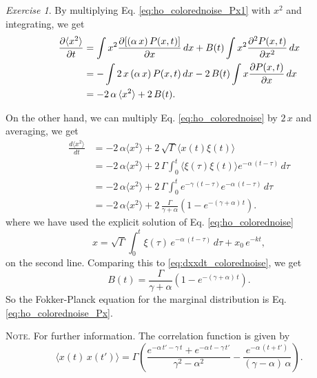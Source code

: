 \documentclass{book}
\numberwithin{equation}{section}
\theoremstyle{plain}
\theoremstyle{definition}
\theoremstyle{remark}
\theoremstyle{BoldStyle}
\newtheorem{exercise}{Exercise}
\numberwithin{exercise}{section}
\newcommand{\note}[1]{{\color{DarkGreen}\footnotesize \textsc{Note.} #1}}
\begin{document}
\begin{exercise}
{    By multiplying Eq. \eqref{eq:ho_colorednoise_Px1} with $x^2$ and integrating,
    we get
    \begin{align}
    \frac{ \partial \langle x^2 \rangle } { \partial t }
    &=
    \int x^2 \frac{ \partial [(\alpha \, x) \, P(x, t) ] } { \partial x} \, dx
    + B(t) \int x^2 \frac{ \partial^2 P(x, t) } { \partial x^2 } \, dx
    \notag
    \\
    &=
    -\int 2 \, x \, (\alpha \, x) \, P(x, t) \, dx
    - 2 \, B(t) \int x \frac{ \partial P(x, t) } { \partial x } \, dx
    \notag
    \\
    &=
    - 2 \, \alpha \, \langle x^2 \rangle
    + 2 \, B(t).
    \label{eq:dxxdt_colorednoise}
    \end{align}

    On the other hand,
    we can multiply Eq. \eqref{eq:ho_colorednoise} by $2 \, x$
    and averaging, we get
    $$
    \begin{aligned}
    \frac{ d\langle x^2 \rangle }{ dt }
    &=
    - 2 \, \alpha \langle x^2 \rangle
    + 2 \, \sqrt\Gamma \langle x(t) \xi(t) \rangle
    \\
    &=
    - 2 \, \alpha \langle x^2 \rangle
    + 2 \, \Gamma \int_0^t \langle \xi(\tau) \xi(t) \rangle e^{-\alpha \, (t - \tau)} \, d\tau
    \\
    &=
    - 2 \, \alpha \langle x^2 \rangle
    + 2 \, \Gamma \int_0^t e^{-\gamma \, (t - \tau)} e^{-\alpha \, (t - \tau)} \, d\tau
    \\
    &=
    - 2 \, \alpha \langle x^2 \rangle
    + 2 \, \frac{ \Gamma }{ \gamma + \alpha}
    \left( 1 - e^{-(\gamma + \alpha) \, t} \right).
    \end{aligned}
    $$
    where we have used the explicit solution of Eq. \eqref{eq:ho_colorednoise}
    $$
    x = \sqrt{\Gamma} \int_0^t \xi(\tau) \, e^{-\alpha \, (t-\tau)}  \, d\tau
      + x_0 \, e^{-kt},
    $$
    on the second line.
    Comparing this to \eqref{eq:dxxdt_colorednoise}, we get
    $$
    B(t) = \frac{ \Gamma } { \gamma + \alpha } \left( 1 - e^{-(\gamma + \alpha) \,t} \right).
    $$
    So the Fokker-Planck equation for the marginal distribution is
    Eq. \eqref{eq:ho_colorednoise_Px}.
  }

  \note{
    For further information.
    The correlation function is given by
    $$
    \langle x(t) \, x(t') \rangle
    =
    \Gamma \left(
      \frac{ e^{-\alpha \, t' - \gamma \, t} + e^{-\alpha \, t - \gamma \, t' }  }
      { \gamma^2 - \alpha^2 }
      -
      \frac{ e^{ -\alpha \, (t + t') } } { (\gamma - \alpha) \, \alpha }
    \right).
    $$
  }


\end{exercise}
\end{document}
